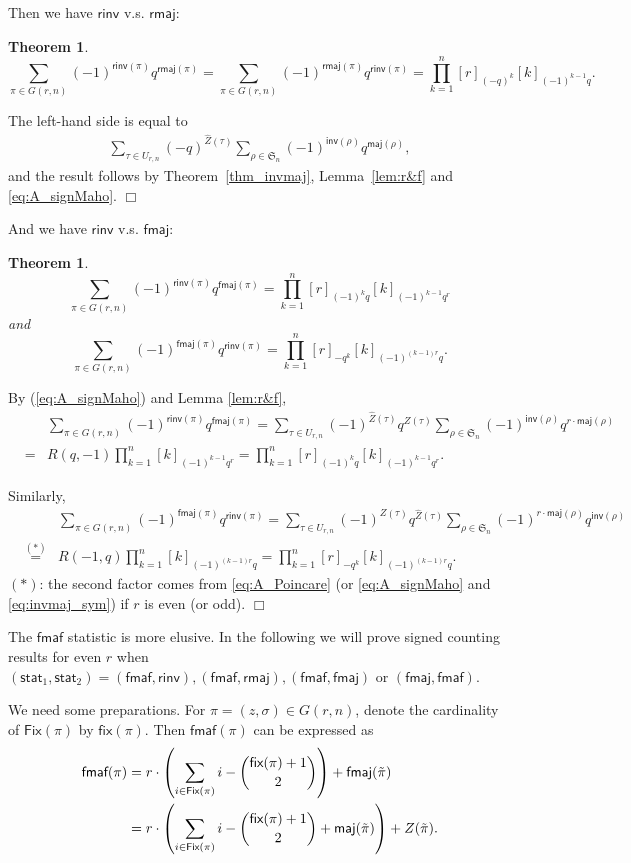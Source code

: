 \documentclass[a4paper, reqno, 11pt]{amsart}
\newtheorem{thm}[lem]{Theorem}
\newcommand{\stat}{{\textsf{stat}}}
\newcommand{\maj}{{\textsf{maj}}}
\newcommand{\inv}{{\textsf{inv}}}
\newcommand{\fmaj}{{\textsf{fmaj}}}
\newcommand{\rmaj}{{\textsf{rmaj}}}
\newcommand{\fmaf}{{\textsf{fmaf}}}
\newcommand{\Fix}{{\textsf{Fix}}}
\newcommand{\fix}{{\textsf{fix}}}
\newcommand{\rinv}{{\textsf{rinv}}}
\numberwithin{equation}{section}
\renewcommand{\d}{\displaystyle}
\def\proof{\noindent{\bf Proof.\quad}}
\def\qed{\hspace*{\fill} $\Box$ \medskip}
\begin{document}
Then we have $\rinv$ v.s. $\rmaj$:
\begin{thm}\label{thm:rmajrinv}
$$\sum_{\pi\in G(r,n)}(-1)^{\rinv(\pi)}q^{\rmaj(\pi)} = \sum_{\pi\in G(r,n)}(-1)^{\rmaj(\pi)}q^{\rinv(\pi)} = \prod_{k=1}^n[r]_{(-q)^{k}}[k]_{(-1)^{k-1}q}.$$
\end{thm}
\proof

The left-hand side is equal to
\begin{eqnarray*}
\sum_{\tau\in U_{r,n}}(-q)^{\hat{Z}(\tau)}\sum_{\rho\in \mathfrak{S}_n}(-1)^{\inv(\rho)}q^{\maj(\rho)},
\end{eqnarray*}
and the result follows by Theorem~\ref{thm_invmaj}, Lemma~\ref{lem:r&f} and \eqref{eq:A_signMaho}.
\qed

And we have $\rinv$ v.s. $\fmaj$:

\begin{thm}\label{thm:fmajrinv}
$$\sum_{\pi\in G(r,n)}(-1)^{\rinv(\pi)}q^{\fmaj(\pi)} = \prod_{k=1}^n[r]_{(-1)^kq}[k]_{(-1)^{k-1}{q^r}}$$
and
$$\d\sum_{\pi\in G(r,n)}(-1)^{\fmaj(\pi)}q^{\rinv(\pi)} = \prod_{k=1}^n[r]_{-q^k}[k]_{(-1)^{(k-1)r}q}.$$
\end{thm}
\proof
By (\ref{eq:A_signMaho}) and Lemma \ref{lem:r&f},
\begin{eqnarray*}
&&\sum_{\pi\in G(r,n)}(-1)^{\rinv(\pi)}q^{\fmaj(\pi)}
=\sum_{\tau\in U_{r,n}}(-1)^{\hat{Z}(\tau)}q^{Z(\tau)}\sum_{\rho\in \mathfrak{S}_n}(-1)^{\inv(\rho)}q^{r\cdot\maj(\rho)}\\
&=& R(q, -1)\prod_{k=1}^{n}[k]_{(-1)^{k-1}{q^r}}
=\prod_{k=1}^n[r]_{(-1)^kq}[k]_{(-1)^{k-1}{q^r}}.
\end{eqnarray*}

Similarly,
\begin{eqnarray*}
&&\sum_{\pi\in G(r,n)}(-1)^{\fmaj(\pi)}q^{\rinv(\pi)}=
\sum_{\tau\in U_{r,n}}(-1)^{Z(\tau)}q^{\hat{Z}(\tau)}\sum_{\rho\in \mathfrak{S}_n}(-1)^{r\cdot\maj(\rho)}{q^{\inv(\rho)}}\\
&\stackrel{(*)}{=}& R(-1, q)\prod_{k=1}^{n}[k]_{(-1)^{(k-1)r}q}
=\prod_{k=1}^n[r]_{-q^k}[k]_{(-1)^{(k-1)r}q}.
\end{eqnarray*}
$(*)$: the second factor comes from \eqref{eq:A_Poincare} (or \eqref{eq:A_signMaho} and \eqref{eq:invmaj_sym}) if $r$ is even (or odd). \qed

The $\fmaf$ statistic is more elusive. In the following we will
prove signed counting results for even $r$ when
$(\stat_1,\stat_2)=(\fmaf,\rinv), (\fmaf, \rmaj),(\fmaf,\fmaj)$ or
$(\fmaj,\fmaf)$.

We need some preparations. 
For $\pi=(z,\sigma)\in G(r,n)$, denote the cardinality of $\Fix(\pi)$ by $\fix(\pi)$. 
Then $\fmaf(\pi)$ can be expressed as
\begin{align}\label{eq:maf_new}
\fmaf(\pi)&=r\cdot \left(\sum_{i\in \Fix(\pi)}i-{\fix(\pi)+1\choose 2}\right)+\fmaj(\tilde{\pi})\notag \\
&=r\cdot \left(\sum_{i\in\Fix(\pi)}i-{\fix(\pi)+1\choose 2}+\maj(\tilde{\pi})\right)+Z(\tilde{\pi}).
\end{align}
\end{document}
